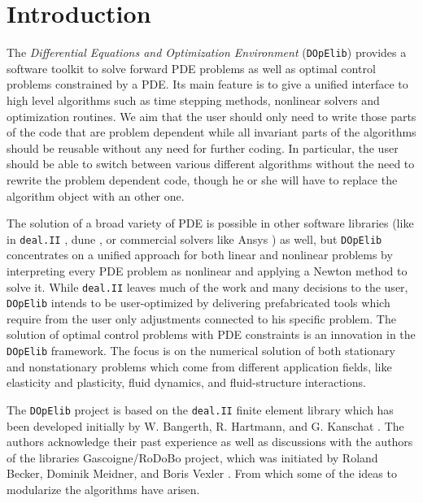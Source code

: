 \documentclass[prodmode,acmtoms]{acmsmall}
\numberwithin{equation}{section}
\newcommand{\deal}{\texttt{deal.II}}
\newcommand{\dope}{\texttt{DOpElib}}
\begin{document}
\section{Introduction}
\label{introduction}
The \textit{Differential Equations and Optimization Environment} (\dope{}) 
provides a software toolkit to solve forward PDE
problems as well as optimal control problems constrained by a PDE. 
Its main feature is to give a unified interface to high level algorithms such as 
time stepping methods, nonlinear solvers and optimization routines. 
We aim that the user should only need to write those parts
of the code that are problem dependent while all invariant parts of the algorithms
should be reusable without any need for further coding.
In particular, the user should be able to switch between various different 
algorithms without the need to rewrite the problem dependent code, though he or she will
have to replace the algorithm object with an other one. 

The
solution of a broad variety of PDE is possible in other software
libraries (like in \deal{} \cite{deal}, dune \cite{dune} , 
or commercial solvers like Ansys \cite{ansys}) 
as well, but
\dope{} concentrates on a unified approach for both linear and nonlinear
problems by interpreting every PDE problem as nonlinear and applying a
Newton method to solve it. While \deal{} leaves much of the work and many
decisions to the user, \dope{} intends to be user-optimized by delivering
prefabricated tools which require from the user only adjustments connected
to his specific problem. The solution of optimal control problems with PDE
constraints is an innovation in the \dope{} framework.
The focus is on the numerical solution of both stationary and nonstationary
problems which come from different application fields, like elasticity and
plasticity, fluid dynamics, and fluid-structure interactions.

The \dope{} project is 
based on the \deal{} \cite{deal} finite element library which has been developed
 initially by W. Bangerth, R. Hartmann, and G. Kanschat \cite{deal}.
The authors acknowledge their past experience as well as discussions with 
the authors of the libraries 
Gascoigne/RoDoBo project, which was initiated by 
Roland Becker, Dominik Meidner,  and Boris Vexler \cite{rodobo}. 
From which some of the ideas to modularize the algorithms have arisen.
\end{document}
